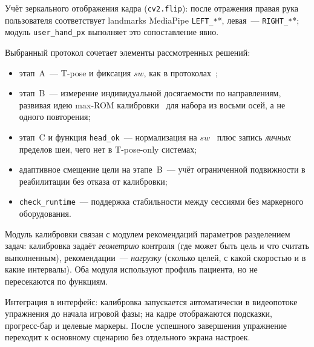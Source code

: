 Учёт зеркального отображения кадра (\texttt{cv2.flip}): после отражения
правая рука пользователя соответствует landmarks MediaPipe
\texttt{LEFT\_*}*, левая~--- \texttt{RIGHT\_*}*; модуль
\texttt{user\_hand\_px} выполняет это сопоставление явно.


Выбранный протокол сочетает элементы рассмотренных решений:
\begin{itemize}
    \item этап~A~--- T-pose и фиксация $sw$, как в
    протоколах~\cite{smartreflex,hovareshti2021};
    \item этап~B~--- измерение индивидуальной досягаемости по
    направлениям, развивая идею max-ROM калибровки~\cite{hou2025}
    для набора из восьми осей, а не одного повторения;
    \item этап~C и функция \texttt{head\_ok}~--- нормализация на
    $sw$~\cite{mediapipe_pose} плюс запись \emph{личных} пределов
    шеи, чего нет в T-pose-only системах;
    \item адаптивное смещение цели на этапе~B~--- учёт ограниченной
    подвижности в реабилитации без отказа от калибровки;
    \item \texttt{check\_runtime}~--- поддержка стабильности между
    сессиями без маркерного оборудования.
\end{itemize}

Модуль калибровки связан с модулем рекомендаций параметров
разделением задач: калибровка задаёт \emph{геометрию} контроля
(где может быть цель и что считать выполненным), рекомендации~---
\emph{нагрузку} (сколько целей, с какой скоростью и в какие
интервалы). Оба модуля используют профиль пациента, но не пересекаются
по функциям.

Интеграция в интерфейс: калибровка запускается автоматически в
видеопотоке упражнения до начала игровой фазы; на кадре отображаются
подсказки, прогресс-бар и целевые маркеры. После успешного завершения
упражнение переходит к основному сценарию без отдельного экрана
настроек.
